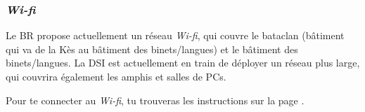 \subsubsection{\emph{Wi-fi}}
\label{wifi} 
Le BR propose actuellement un réseau \emph{Wi-fi}, qui couvre le bataclan (bâtiment qui va de la Kès au bâtiment des
binets/langues) et le bâtiment des binets/langues. La DSI est actuellement en train de déployer un réseau plus large, qui couvrira également les amphis et salles de PCs.

 Pour te connecter au \emph{Wi-fi}, tu trouveras les instructions sur la page .




